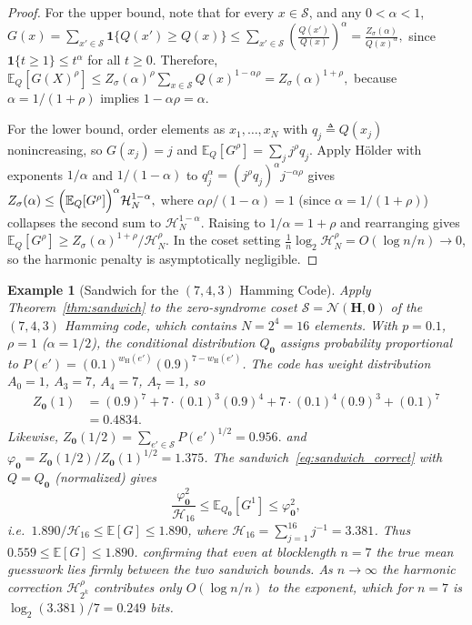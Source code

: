 \documentclass[journal,10pt,onecolumn]{IEEEtran}
\newtheorem{example}{Example}
\newcommand{\Eb}{\mathbb{E}}
\newcommand{\wH}{w_{\mathrm{H}}}
\newcommand{\Nb}{\mathcal{N}}
\newcommand{\Hm}{\mathbf{H}}
\newcommand{\Harm}{\mathcal{H}}
\begin{document}
\begin{proof}
For the upper bound, note that for every $x\in\mathcal S$, and any $0<\alpha<1$,
\(
G(x)
=
\sum_{x'\in\mathcal S}\mathbf 1\{Q(x')\ge Q(x)\}
\le
\sum_{x'\in\mathcal S}\left(\frac{Q(x')}{Q(x)}\right)^\alpha
=
\frac{Z_\sigma (\alpha)}{Q(x)^\alpha},
\)
since $\mathbf 1\{t\ge 1\}\le t^\alpha$ for all $t\ge 0$.
Therefore,
\(
\mathbb E_Q[G(X)^\rho]
\le
Z_\sigma (\alpha)^\rho \sum_{x\in\mathcal S} Q(x)^{1-\alpha\rho}
=
Z_\sigma (\alpha)^{1+\rho},
\)
because $\alpha=1/(1+\rho)$ implies $1-\alpha\rho=\alpha$.


For the lower bound, order elements as $x_1,\ldots,x_N$ with
$q_j\triangleq Q(x_j)$ nonincreasing, so $G(x_j)=j$ and
$\mathbb{E}_Q[G^\rho]=\sum_j j^\rho q_j$.
Apply Hölder with exponents $1/\alpha$ and $1/(1-\alpha)$ to
$q_j^\alpha=(j^\rho q_j)^\alpha j^{-\alpha\rho}$ gives
\(
Z_\sigma(\alpha)\le\Bigl(\mathbb{E}_Q[G^\rho]\Bigr)^{\alpha}
\Harm_N^{1-\alpha},
\)
where $\alpha\rho/(1-\alpha)=1$ (since $\alpha=1/(1+\rho)$) collapses
the second sum to $\Harm_N^{1-\alpha}$.
Raising to $1/\alpha=1+\rho$ and rearranging gives
$\mathbb{E}_Q[G^\rho]\ge Z_\sigma(\alpha)^{1+\rho}/\Harm_N^\rho$.
In the coset setting $\frac{1}{n}\log_2\Harm_N^\rho=O(\log n/n)\to 0$,
so the harmonic penalty is asymptotically negligible.
\end{proof}

\begin{example}[Sandwich for the $(7,4,3)$ Hamming Code]
\label{ex:hamming_sandwich}
Apply Theorem~\ref{thm:sandwich} to the zero-syndrome coset
$\mathcal{S}=\Nb(\Hm,\bm{0})$ of the $(7,4,3)$ Hamming code,
which contains $N=2^4=16$ elements.
With $p=0.1$, $\rho=1$ ($\alpha=1/2$), the conditional
distribution $Q_{\bm{0}}$ assigns probability proportional to
$P(e')=(0.1)^{\wH(e')}(0.9)^{7-\wH(e')}$.
The code has weight distribution
$A_0=1$, $A_3=7$, $A_4=7$, $A_7=1$, so
\begin{align*}
Z_{\bm{0}}(1)&=(0.9)^7+7\cdot(0.1)^3(0.9)^4
+7\cdot(0.1)^4(0.9)^3+(0.1)^7\\
& = 0.4834.
\end{align*}
Likewise,
\(
Z_{\bm{0}}(1/2)=\sum_{e'\in\mathcal{S}}P(e')^{1/2}=0.956.
\)
and
$\varphi_{\bm{0}}=Z_{\bm{0}}(1/2)/Z_{\bm{0}}(1)^{1/2}
  = 1.375$.
The sandwich~\eqref{eq:sandwich_correct} with $Q=Q_{\bm{0}}$
(normalized) gives
\[
\frac{\varphi_{\bm{0}}^2}{\Harm_{16}}
\le
\Eb_{Q_{\bm{0}}}[G^1]
\le
\varphi_{\bm{0}}^2,
\]
i.e.\
$1.890/\Harm_{16}\le\Eb[G]\le1.890$,
where $\Harm_{16}=\sum_{j=1}^{16}j^{-1} = 3.381$.
Thus $0.559\le\Eb[G]\le1.890$.
confirming that even at blocklength $n=7$ the true mean guesswork
lies firmly between the two sandwich bounds.
As $n\to\infty$ the harmonic correction $\Harm_{2^k}^{\rho}$
contributes only $O(\log n/n)$ to the exponent,
which for $n=7$ is $\log_2(3.381)/7 = 0.249$ bits.
\end{example}
\end{document}
